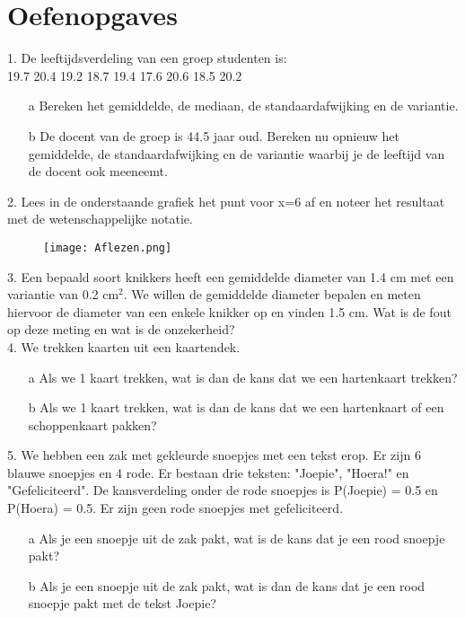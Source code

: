 \section{Oefenopgaves}
\label{/tussentoets-i/oefenopgaves}

1. De leeftijdsverdeling van een groep studenten is:\\
{ 19.7 20.4 19.2 18.7 19.4 17.6 20.6 18.5 20.2}
\begin{itemize}
\item[a]  Bereken het gemiddelde, de mediaan, de standaardafwijking en de variantie.
\item[b] De docent van de groep is 44.5 jaar oud.  
Bereken nu opnieuw het gemiddelde, de standaardafwijking en de variantie waarbij je de leeftijd van de docent ook meeneemt. \\
\end{itemize}


2. Lees in de onderstaande grafiek het punt voor x=6 af en noteer het resultaat met de wetenschappelijke notatie. 

\begin{figure}[h!]
\centering
\texttt{[image: Aflezen.png]}
\label{fig:Aflezen}
\end{figure}


3. Een bepaald soort knikkers heeft een gemiddelde diameter van 1.4 cm met een variantie van 0.2 cm$^2$. We willen de gemiddelde diameter bepalen en meten hiervoor de diameter van een enkele knikker op en vinden 1.5 cm. Wat is de fout op deze meting en wat is de onzekerheid? \\


4. We trekken kaarten uit een kaartendek.
\begin{itemize}
\item[a] Als we 1 kaart trekken, wat is dan de kans dat we een hartenkaart trekken?
\item[b] Als we 1 kaart trekken, wat is dan de kans dat we een hartenkaart of een schoppenkaart pakken?
\end{itemize}


5. We hebben een zak met gekleurde snoepjes met een tekst erop. Er zijn 6 blauwe snoepjes en 4 rode. Er bestaan drie teksten: "Joepie", "Hoera!" en "Gefeliciteerd". De kansverdeling onder de rode snoepjes is P(Joepie) = 0.5 en P(Hoera) = 0.5. Er zijn geen rode snoepjes met gefeliciteerd. 
\begin{itemize}
\item[a] Als je een snoepje uit de zak pakt, wat is de kans dat je een rood snoepje pakt?
\item[b] Als je een snoepje uit de zak pakt, wat is dan de kans dat je een rood snoepje pakt met de tekst Joepie?
\end{itemize}



